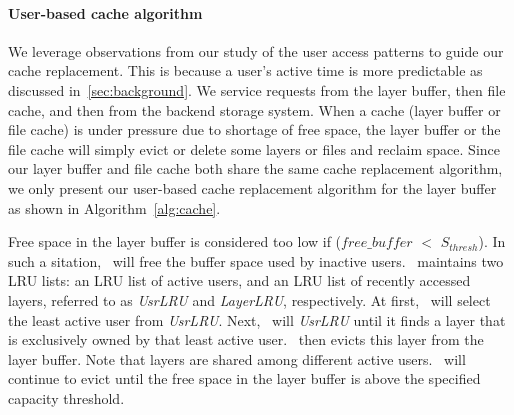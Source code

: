 \paragraph{User-based cache algorithm}



We leverage observations from our study of the user access patterns to guide our cache replacement. This is because
a user's active time is more predictable as discussed in~\cref{sec:background}.
We service requests from the layer buffer, then file cache, and then from the backend storage system. 
When a cache (layer buffer or file cache) is under pressure due to 
shortage of free space,
the layer buffer or the file cache will simply evict or delete some layers or files and reclaim space.
Since our layer buffer and file cache both share the same cache replacement algorithm, we only present
our user-based cache replacement algorithm for the layer buffer as shown in Algorithm~\ref{alg:cache}.

Free space in the layer buffer is considered too low if ($free\_buffer$ $<$ $S_{thresh}$). 
In such a sitation, \sysname~will free the buffer space used by inactive users. 
\sysname~maintains two LRU lists: an LRU list of active users, and
an LRU list of recently accessed layers, referred to as \emph{UsrLRU} and \emph{LayerLRU}, respectively.
At first, \sysname~will select the least active user from \emph{UsrLRU}.
Next, \sysname~will  \emph{UsrLRU} until it finds a layer that is exclusively owned by that least active user. 
\sysname~then evicts this layer from the layer buffer. 
 Note that layers are shared among different active users.
 \sysname~will continue to evict until the free space in the layer buffer is above the specified capacity threshold.
 


